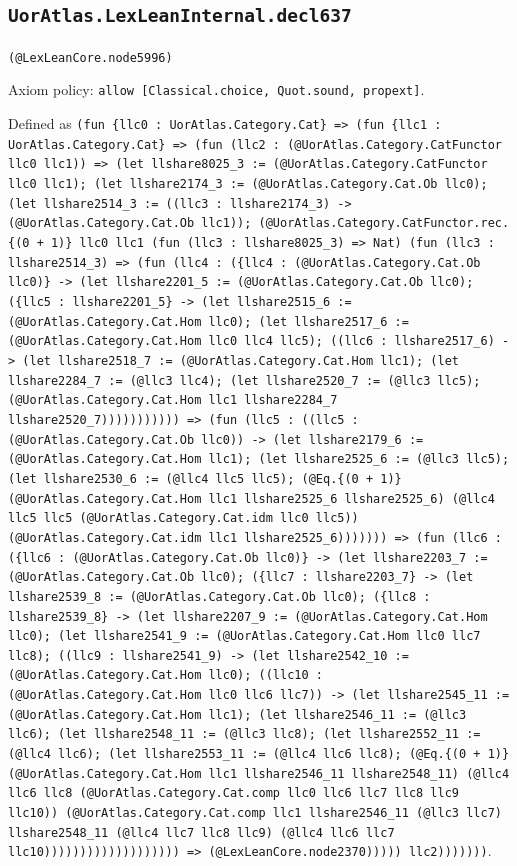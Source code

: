 \documentclass[11pt]{article}
\begin{document}
\subsection*{\texttt{UorAtlas.LexLeanInternal.decl637}}
\noindent\texttt{(@LexLeanCore.node5996)}\par
\noindent Axiom policy: \texttt{allow [Classical.choice, Quot.sound, propext]}.\par
\noindent Defined as \texttt{(fun \{llc0 : UorAtlas.Category.Cat\} => (fun \{llc1 : UorAtlas.Category.Cat\} => (fun (llc2 : (@UorAtlas.Category.CatFunctor llc0 llc1)) => (let llshare8025\_3 := (@UorAtlas.Category.CatFunctor llc0 llc1); (let llshare2174\_3 := (@UorAtlas.Category.Cat.Ob llc0); (let llshare2514\_3 := ((llc3 : llshare2174\_3) -> (@UorAtlas.Category.Cat.Ob llc1)); (@UorAtlas.Category.CatFunctor.rec.\{(0 + 1)\} llc0 llc1 (fun (llc3 : llshare8025\_3) => Nat) (fun (llc3 : llshare2514\_3) => (fun (llc4 : (\{llc4 : (@UorAtlas.Category.Cat.Ob llc0)\} -> (let llshare2201\_5 := (@UorAtlas.Category.Cat.Ob llc0); (\{llc5 : llshare2201\_5\} -> (let llshare2515\_6 := (@UorAtlas.Category.Cat.Hom llc0); (let llshare2517\_6 := (@UorAtlas.Category.Cat.Hom llc0 llc4 llc5); ((llc6 : llshare2517\_6) -> (let llshare2518\_7 := (@UorAtlas.Category.Cat.Hom llc1); (let llshare2284\_7 := (@llc3 llc4); (let llshare2520\_7 := (@llc3 llc5); (@UorAtlas.Category.Cat.Hom llc1 llshare2284\_7 llshare2520\_7))))))))))) => (fun (llc5 : ((llc5 : (@UorAtlas.Category.Cat.Ob llc0)) -> (let llshare2179\_6 := (@UorAtlas.Category.Cat.Hom llc1); (let llshare2525\_6 := (@llc3 llc5); (let llshare2530\_6 := (@llc4 llc5 llc5); (@Eq.\{(0 + 1)\} (@UorAtlas.Category.Cat.Hom llc1 llshare2525\_6 llshare2525\_6) (@llc4 llc5 llc5 (@UorAtlas.Category.Cat.idm llc0 llc5)) (@UorAtlas.Category.Cat.idm llc1 llshare2525\_6))))))) => (fun (llc6 : (\{llc6 : (@UorAtlas.Category.Cat.Ob llc0)\} -> (let llshare2203\_7 := (@UorAtlas.Category.Cat.Ob llc0); (\{llc7 : llshare2203\_7\} -> (let llshare2539\_8 := (@UorAtlas.Category.Cat.Ob llc0); (\{llc8 : llshare2539\_8\} -> (let llshare2207\_9 := (@UorAtlas.Category.Cat.Hom llc0); (let llshare2541\_9 := (@UorAtlas.Category.Cat.Hom llc0 llc7 llc8); ((llc9 : llshare2541\_9) -> (let llshare2542\_10 := (@UorAtlas.Category.Cat.Hom llc0); ((llc10 : (@UorAtlas.Category.Cat.Hom llc0 llc6 llc7)) -> (let llshare2545\_11 := (@UorAtlas.Category.Cat.Hom llc1); (let llshare2546\_11 := (@llc3 llc6); (let llshare2548\_11 := (@llc3 llc8); (let llshare2552\_11 := (@llc4 llc6); (let llshare2553\_11 := (@llc4 llc6 llc8); (@Eq.\{(0 + 1)\} (@UorAtlas.Category.Cat.Hom llc1 llshare2546\_11 llshare2548\_11) (@llc4 llc6 llc8 (@UorAtlas.Category.Cat.comp llc0 llc6 llc7 llc8 llc9 llc10)) (@UorAtlas.Category.Cat.comp llc1 llshare2546\_11 (@llc3 llc7) llshare2548\_11 (@llc4 llc7 llc8 llc9) (@llc4 llc6 llc7 llc10))))))))))))))))))) => (@LexLeanCore.node2370))))) llc2)))))))}.\par
\end{document}
